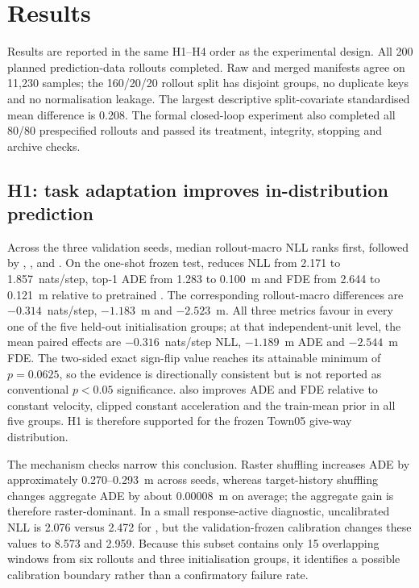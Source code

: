\section{Results}
\label{sec:results}

Results are reported in the same H1--H4 order as the experimental design. All
200 planned prediction-data rollouts completed. Raw and merged manifests agree
on 11,230 samples; the 160/20/20 rollout split has disjoint groups, no duplicate
keys and no normalisation leakage. The largest descriptive split-covariate
standardised mean difference is 0.208. The formal closed-loop experiment also
completed all 80/80 prespecified rollouts and passed its treatment, integrity,
stopping and archive checks.

\subsection{H1: task adaptation improves in-distribution prediction}

Across the three validation seeds, median rollout-macro NLL ranks \Bone{}
first, followed by \BtwoD{}, \Ttwo{}, \Tone{} and \BtwoM{}. On the one-shot
frozen test, \Bone{} reduces NLL from 2.171 to 1.857~nats/step, top-1 ADE from
1.283 to 0.100~m and FDE from 2.644 to 0.121~m relative to pretrained \Bzero{}.
The corresponding rollout-macro differences are $-0.314$~nats/step,
$-1.183$~m and $-2.523$~m. All three metrics favour \Bone{} in every one of
the five held-out initialisation groups; at that independent-unit level, the
mean paired effects are $-0.316$~nats/step NLL, $-1.189$~m ADE and
$-2.544$~m FDE. The two-sided exact sign-flip value reaches its attainable
minimum of $p=0.0625$, so the evidence is directionally consistent but is not
reported as conventional $p<0.05$ significance. \Bone{} also improves ADE and
FDE relative to constant velocity, clipped constant acceleration and the
train-mean prior in all five groups. H1 is therefore supported for the frozen
Town05 give-way distribution.



The mechanism checks narrow this conclusion. Raster shuffling increases
\Bone{} ADE by approximately 0.270--0.293~m across seeds, whereas target-history
shuffling changes aggregate ADE by about 0.00008~m on average; the aggregate
gain is therefore raster-dominant. In a small response-active diagnostic,
uncalibrated \Bone{} NLL is 2.076 versus 2.472 for \Bzero{}, but the
validation-frozen calibration changes these values to 8.573 and 2.959. Because
this subset contains only 15 overlapping windows from six rollouts and three
initialisation groups, it identifies a possible calibration boundary rather
than a confirmatory failure rate.

